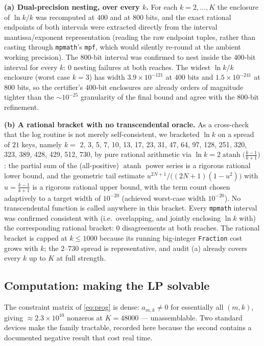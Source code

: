\documentclass[11pt]{article}
\theoremstyle{remark}
\begin{document}
\textbf{(a) Dual-precision nesting, over every $k$.} For each $k = 2,\dots,K$
the enclosure of $\ln k / k$ was recomputed at $400$ and at $800$ bits, and
the exact rational endpoints of both intervals were extracted directly from
the interval mantissa/exponent representation (reading the raw endpoint
tuples, rather than casting through \texttt{mpmath}'s \texttt{mpf}, which
would silently re-round at the ambient working precision). The $800$-bit
interval was confirmed to nest inside the $400$-bit interval for every $k$:
$0$ nesting failures at both reaches. The widest $\ln k / k$ enclosure
(worst case $k=3$) has width $3.9\times10^{-121}$ at $400$ bits and
$1.5\times10^{-241}$ at $800$ bits, so the certifier's $400$-bit enclosures
are already orders of magnitude tighter than the $\sim10^{-25}$ granularity
of the final bound and agree with the $800$-bit refinement.

\textbf{(b) A rational bracket with no transcendental oracle.} As a
cross-check that the log routine is not merely self-consistent, we bracketed
$\ln k$ on a spread of $21$ keys, namely $k =$
2, 3, 5, 7, 10, 13, 17, 23, 31, 47, 64, 97, 128, 251, 320, 323, 389, 428,
429, 512, 730, by pure rational arithmetic via
$\ln k = 2\operatorname{atanh}\!\bigl(\tfrac{k-1}{k+1}\bigr)$: the partial
sum of the (all-positive) $\operatorname{atanh}$ power series is a rigorous
rational lower bound, and the geometric tail estimate
$u^{2N+1}/\bigl((2N+1)(1-u^{2})\bigr)$ with $u=\tfrac{k-1}{k+1}$ is a
rigorous rational upper bound, with the term count chosen adaptively to a
target width of $10^{-20}$ (achieved worst-case width $10^{-20}$). No
transcendental function is called anywhere in this bracket. Every
\texttt{mpmath} interval was confirmed consistent with (i.e.\ overlapping,
and jointly enclosing $\ln k$ with) the corresponding rational bracket:
$0$ disagreements at both reaches. The rational bracket is capped at
$k \le 1000$ because its running big-integer \texttt{Fraction} cost grows
with $k$; the $2$--$730$ spread is representative, and audit (a) already
covers every $k$ up to $K$ at full strength.

\subsection{Computation: making the LP solvable}\label{sec:compute}

The constraint matrix of \eqref{eq:prog} is dense: $a_{m,k} \ne 0$ for
essentially all $(m,k)$, giving $\approx 2.3\times10^{10}$ nonzeros at
$K = 48000$ --- unassemblable. Two standard devices make the family
tractable, recorded here because the second contains a documented negative
result that cost real time.
\end{document}
